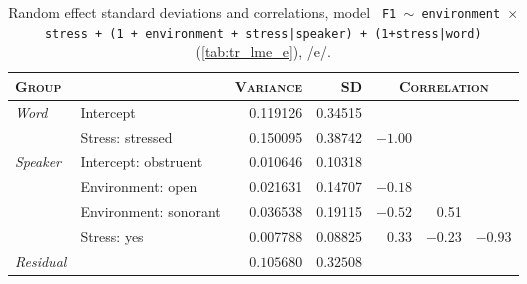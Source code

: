 \begin{table}[H]
  \centering\footnotesize
  \begin{tabular}{llrrrrr}
    \toprule
    \textsc{Group} & \textsc{} & \textsc{Variance} & \textsc{SD} & \multicolumn{3}{c}{\textsc{Correlation}}\\
    \midrule
    \multirow{2}{*}{\textit{Word}} & Intercept & 0.119126 & 0.34515  \\
                & Stress: stressed & 0.150095 & 0.38742 & $-1.00$  \\
    \midrule
    \multirow{4}{*}{\textit{Speaker}} & Intercept: obstruent & 0.010646 & 0.10318  \\
                & Environment: open                        & 0.021631 & 0.14707   & $-0.18$  \\
                & Environment: sonorant                    & 0.036538 & 0.19115  & $-0.52$ &  0.51    \\
                & Stress: yes                              & 0.007788 & 0.08825  & 0.33    & $-0.23$ &$-0.93$ \\
    \midrule
    \textit{Residual} & & $0.105680$ & $0.32508$ \\
    \bottomrule
  \end{tabular}
  \caption[\texttt{\footnotesize F1 $\sim$ environment$\times$stress + (1 + environment + stress|speaker) + (1|word)}, /e/]{Random effect standard deviations and correlations, model \texttt{ F1 $\sim$ environment $\times$ stress + (1 + environment + stress|speaker) + (1+stress|word)} (\cref{tab:tr_lme_e}), /e/.}
  \label{tab:tr_lme_e_random}
\end{table}

